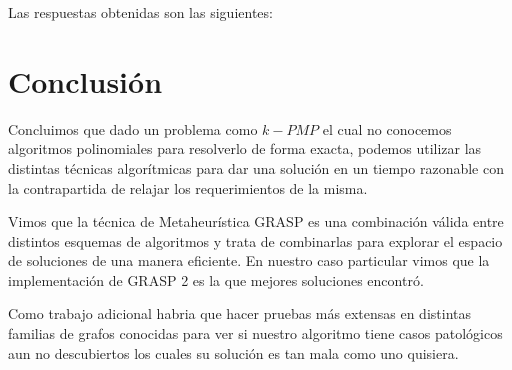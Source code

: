 Las respuestas obtenidas son las siguientes:


\section{Conclusión}

Concluimos que dado un problema como $k-PMP$ el cual no conocemos algoritmos polinomiales para resolverlo de forma exacta, podemos utilizar las distintas técnicas algorítmicas para dar una solución en un tiempo razonable con la contrapartida de relajar los requerimientos de la misma. 

Vimos que la técnica de Metaheurística GRASP es una combinación válida entre distintos esquemas de algoritmos y trata de combinarlas para explorar el espacio de soluciones de una manera eficiente. En nuestro caso particular vimos que la implementación de GRASP 2 es la que mejores soluciones encontró. 

Como trabajo adicional habria que hacer pruebas más extensas en distintas familias de grafos conocidas para ver si nuestro algoritmo tiene casos patológicos aun no descubiertos los cuales su solución es tan mala como uno quisiera.